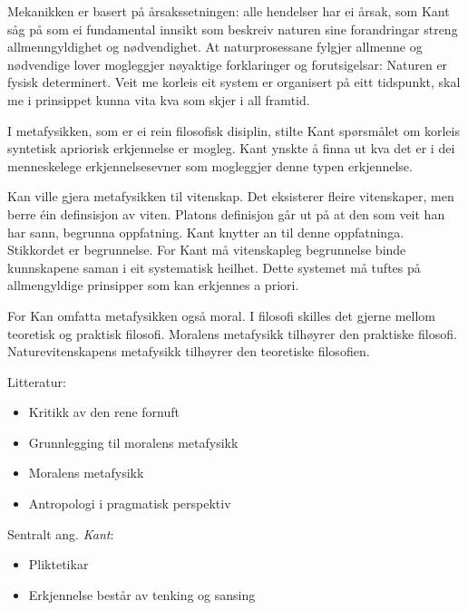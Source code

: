 \documentclass[a4paper]{IEEEtran}
\begin{document}
Mekanikken er basert på årsakssetningen: alle hendelser har ei årsak, som Kant såg på som ei fundamental innsikt som beskreiv naturen sine forandringar streng allmenngyldighet og nødvendighet. At naturprosessane fylgjer allmenne og nødvendige lover mogleggjer nøyaktige forklaringer og forutsigelsar: Naturen er fysisk determinert. Veit me korleis eit system er organisert på eitt tidspunkt, skal me i prinsippet kunna vita kva som skjer i all framtid.\bigskip

I metafysikken, som er ei rein filosofisk disiplin, stilte Kant spørsmålet om korleis syntetisk apriorisk erkjennelse er mogleg. Kant ynskte å finna ut kva det er i dei menneskelege erkjennelsesevner som mogleggjer denne typen erkjennelse.\bigskip

Kan ville gjera metafysikken til vitenskap. Det eksisterer fleire vitenskaper, men berre éin definsisjon av viten. Platons definisjon går ut på at den som veit han har sann, begrunna oppfatning. Kant knytter an til denne oppfatninga. Stikkordet er begrunnelse. For Kant må vitenskapleg begrunnelse binde kunnskapene saman i eit systematisk heilhet. Dette systemet må tuftes på allmengyldige prinsipper som kan erkjennes a priori.\bigskip

For Kan omfatta metafysikken også moral. I filosofi skilles det gjerne mellom teoretisk og praktisk filosofi. Moralens metafysikk tilhøyrer den praktiske filosofi. Naturevitenskapens metafysikk tilhøyrer den teoretiske filosofien.\bigskip

\begin{center}
Litteratur:
\end{center}
\begin{itemize}
    \item Kritikk av den rene fornuft
    \item Grunnlegging til moralens metafysikk
    \item Moralens metafysikk
    \item Antropologi i pragmatisk perspektiv
\end{itemize}\bigskip 

\begin{center}
Sentralt ang. \textit{Kant}:
\end{center}
\begin{itemize}\bigskip
    \item Pliktetikar
    \item Erkjennelse består av tenking og sansing
\end{itemize}\bigskip
\end{document}
